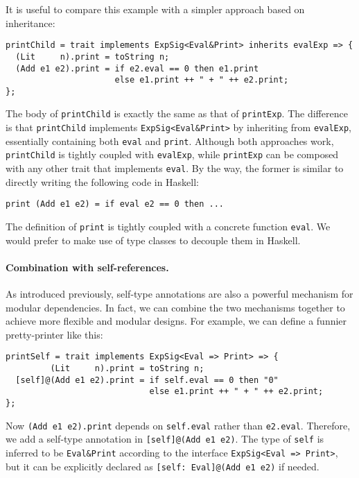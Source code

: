 It is useful to compare this example with a simpler approach based on
inheritance:
\begin{lstlisting}
printChild = trait implements ExpSig<Eval&Print> inherits evalExp => {
  (Lit     n).print = toString n;
  (Add e1 e2).print = if e2.eval == 0 then e1.print
                      else e1.print ++ " + " ++ e2.print;
};
\end{lstlisting}
The body of \lstinline{printChild} is exactly the same as that of
\lstinline{printExp}. The difference is that \lstinline{printChild} implements
\lstinline{ExpSig<Eval&Print>} by inheriting from \lstinline{evalExp},
essentially containing both \lstinline{eval} and \lstinline{print}. Although
both approaches work, \lstinline{printChild} is tightly coupled with
\lstinline{evalExp}, while \lstinline{printExp} can be composed with any other
trait that implements \lstinline{eval}. By the way, the former is similar to
directly writing the following code in Haskell:
\begin{lstlisting}
print (Add e1 e2) = if eval e2 == 0 then ...
\end{lstlisting}
The definition of \lstinline{print} is tightly coupled with a concrete function
\lstinline{eval}. We would prefer to make use of type classes to decouple them
in Haskell.

\paragraph{Combination with self-references.}
As introduced previously, self-type annotations are also a powerful mechanism
for modular dependencies. In fact, we can combine the two mechanisms together
to achieve more flexible and modular designs. For example, we can define a
funnier pretty-printer like this:
\begin{lstlisting}
printSelf = trait implements ExpSig<Eval => Print> => {
         (Lit     n).print = toString n;
  [self]@(Add e1 e2).print = if self.eval == 0 then "0"
                             else e1.print ++ " + " ++ e2.print;
};
\end{lstlisting}
Now \lstinline{(Add e1 e2).print} depends on \lstinline{self.eval} rather than
\lstinline{e2.eval}. Therefore, we add a self-type annotation in
\lstinline{[self]@(Add e1 e2)}. The type of \lstinline{self} is inferred to be
\lstinline{Eval&Print} according to the interface \lstinline{ExpSig<Eval => Print>},
but it can be explicitly declared as \lstinline{[self: Eval]@(Add e1 e2)} if needed.

